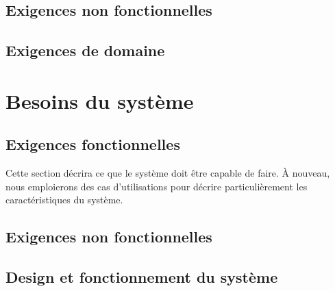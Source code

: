 \documentclass[a4paper, 11pt]{report}
\begin{document}
\section{Exigences non fonctionnelles}



\section{Exigences de domaine}


\chapter{Besoins du système}
\section{Exigences fonctionnelles}
Cette section décrira ce que le système doit être capable de faire. À nouveau, nous emploierons des cas d'utilisations pour décrire particulièrement les caractéristiques du système.



\section{Exigences non fonctionnelles}


\section{Design et fonctionnement du système}



\appendix
\printindex
\listoffigures
\end{document}
